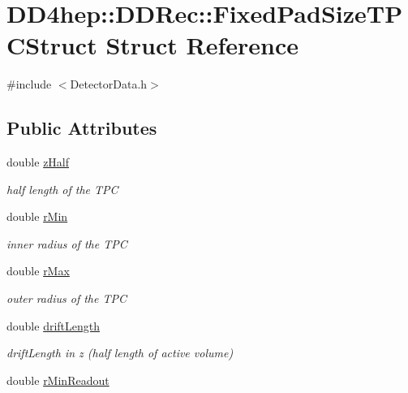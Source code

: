 \hypertarget{struct_d_d4hep_1_1_d_d_rec_1_1_fixed_pad_size_t_p_c_struct}{}\section{D\+D4hep\+:\+:D\+D\+Rec\+:\+:Fixed\+Pad\+Size\+T\+P\+C\+Struct Struct Reference}
\label{struct_d_d4hep_1_1_d_d_rec_1_1_fixed_pad_size_t_p_c_struct}


{\ttfamily \#include $<$Detector\+Data.\+h$>$}

\subsection*{Public Attributes}
\begin{DoxyCompactItemize}
\item 
double \hyperlink{struct_d_d4hep_1_1_d_d_rec_1_1_fixed_pad_size_t_p_c_struct_a0985275f7d588c0b441a95ea09706328}{z\+Half}
\begin{DoxyCompactList}\small\item\em half length of the T\+PC \end{DoxyCompactList}\item 
double \hyperlink{struct_d_d4hep_1_1_d_d_rec_1_1_fixed_pad_size_t_p_c_struct_af756bdcb676af4d4fb3b02d7fb8024a8}{r\+Min}
\begin{DoxyCompactList}\small\item\em inner radius of the T\+PC \end{DoxyCompactList}\item 
double \hyperlink{struct_d_d4hep_1_1_d_d_rec_1_1_fixed_pad_size_t_p_c_struct_a623ee3ca76535b9c0ec2fe6c3e1ce415}{r\+Max}
\begin{DoxyCompactList}\small\item\em outer radius of the T\+PC \end{DoxyCompactList}\item 
double \hyperlink{struct_d_d4hep_1_1_d_d_rec_1_1_fixed_pad_size_t_p_c_struct_ac71f3e69ce1a9466cadb912e80d11500}{drift\+Length}
\begin{DoxyCompactList}\small\item\em drift\+Length in z (half length of active volume) \end{DoxyCompactList}\item 
double \hyperlink{struct_d_d4hep_1_1_d_d_rec_1_1_fixed_pad_size_t_p_c_struct_abde215fe45dde9a8bfdbc46499d8daad}{r\+Min\+Readout}

\end{DoxyCompactItemize}
